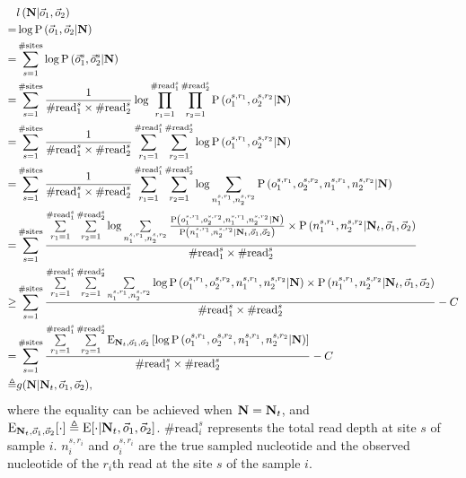\documentclass{article}
\begin{document}
\begin{align}
&l\left({\bf N}|\vec{o}_1,\vec{o}_2\right) \nonumber\\
=&\log\mathrm{P}\left(\vec{o}_1,\vec{o}_2|{\bf N}\right) \nonumber\\
=&\sum_{s=1}^{\#\mathrm{sites}}\log\mathrm{P}\left(\vec{o}_1^s,\vec{o}_2^s|{\bf N}\right)\nonumber\\
=&\sum_{s=1}^{\#\mathrm{sites}}\frac{1}{\#\mathrm{read}_1^s\times\#\mathrm{read}_2^s}\log\prod_{r_1=1}^{\#\mathrm{read}_1^s}\prod_{r_2=1}^{\#\mathrm{read}_2^s}\mathrm{P}\left(o_1^{s,r_1},o_2^{s,r_2}|{\bf N}\right)\nonumber\\
=&\sum_{s=1}^{\#\mathrm{sites}}\frac{1}{\#\mathrm{read}_1^s\times\#\mathrm{read}_2^s}\sum_{r_1=1}^{\#\mathrm{read}_1^s}\sum_{r_2=1}^{\#\mathrm{read}_2^s}\log\mathrm{P}\left(o_1^{s,r_1},o_2^{s,r_2}|{\bf N}\right)\nonumber\\
=&\sum_{s=1}^{\#\mathrm{sites}}\frac{1}{\#\mathrm{read}_1^s\times\#\mathrm{read}_2^s}\sum_{r_1=1}^{\#\mathrm{read}_1^s}\sum_{r_2=1}^{\#\mathrm{read}_2^s}\log\sum_{n_1^{s,r_1},n_2^{s,r_2}}\mathrm{P}\left(o_1^{s,r_1},o_2^{s,r_2},n_1^{s,r_1},n_2^{s,r_2}|{\bf N}\right)\nonumber\\
=&\sum_{s=1}^{\#\mathrm{sites}}\frac{\sum\limits_{r_1=1}^{\#\mathrm{read}_1^s}\sum\limits_{r_2=1}^{\#\mathrm{read}_2^s}\log\sum\limits_{n_1^{s,r_1},n_2^{s,r_2}}\frac{\mathrm{P}\left(o_1^{s,r_1},o_2^{s,r_2},n_1^{s,r_1},n_2^{s,r_2}|{\bf N}\right)}{\mathrm{P}\left(n_1^{s,r_1},n_2^{s,r_2}|{\bf N}_t,\vec{o}_1,\vec{o}_2\right)}\times \mathrm{P}\left(n_1^{s,r_1},n_2^{s,r_2}|{\bf N}_t,\vec{o}_1,\vec{o}_2\right)}{\#\mathrm{read}_1^s\times\#\mathrm{read}_2^s}\nonumber\\
\geq&\sum_{s=1}^{\#\mathrm{sites}}\frac{\sum\limits_{r_1=1}^{\#\mathrm{read}_1^s}\sum\limits_{r_2=1}^{\#\mathrm{read}_2^s}\sum\limits_{n_1^{s,r_1},n_2^{s,r_2}}\log\mathrm{P}\left(o_1^{s,r_1},o_2^{s,r_2},n_1^{s,r_1},n_2^{s,r_2}|{\bf N}\right)\times \mathrm{P}\left(n_1^{s,r_1},n_2^{s,r_2}|{\bf N}_t,\vec{o}_1,\vec{o}_2\right)}{\#\mathrm{read}_1^s\times\#\mathrm{read}_2^s}-C\nonumber\\
=&\sum_{s=1}^{\#\mathrm{sites}}\frac{\sum\limits_{r_1=1}^{\#\mathrm{read}_1^s}\sum\limits_{r_2=1}^{\#\mathrm{read}_2^s}\mathrm{E}_{{\bf N}_t,\vec{o}_1,\vec{o}_2}\left[\log\mathrm{P}\left(o_1^{s,r_1},o_2^{s,r_2},n_1^{s,r_1},n_2^{s,r_2}|{\bf N}\right)\right]}{\#\mathrm{read}_1^s\times\#\mathrm{read}_2^s}-C \nonumber\\
\triangleq& g({\bf N}|{\bf N}_t,\vec{o}_1,\vec{o}_2),\label{eq:distAngsd-nucEM}
\end{align}
where the equality can be achieved when ${\bf N}={\bf N}_t$, and $\mathrm{E}_{{\bf N}_{t},\vec{o}_1,\vec{o}_2}[\cdot]\triangleq \mathrm{E}[\cdot|{\bf N}_{t},\vec{o}_1,\vec{o}_2]$. $\#\mathrm{read}_i^s$ represents the total read depth at site $s$ of sample $i$. $n_i^{s,r_i}$ and $o_i^{s,r_i}$ are the true sampled nucleotide and the observed nucleotide of the $r_i$th read at the site $s$ of the sample $i$.
\end{document}
